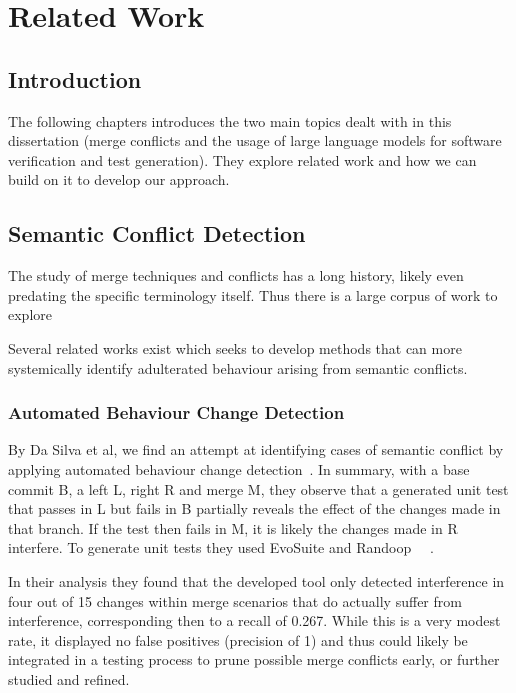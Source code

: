 \chapter{Related Work} \label{chap:sota}

\section{Introduction}

 The following chapters introduces the two main topics dealt with in this dissertation (merge conflicts and the usage of large language models for software verification and test generation). They explore related work and how we can build on it to develop our approach.

\section{Semantic Conflict Detection}

The study of merge techniques and conflicts has a long history, likely even predating the specific terminology itself. Thus there is a large corpus of work to explore

Several related works exist which seeks to develop methods that can more systemically identify adulterated behaviour arising from semantic conflicts.

\subsection{Automated Behaviour Change Detection}

By Da Silva et al, we find an attempt at identifying cases of semantic conflict by applying automated behaviour change detection~\citep{kn:leuson}. In summary, with a base commit B, a left L, right R and merge M, they observe that a generated unit test that passes in L but fails in B partially reveals the effect of the changes made in that branch. If the test then fails in M, it is likely the changes made in R interfere. To generate unit tests they used EvoSuite and Randoop~\citep{kn:randoop}
~\citep{kn:evosuite}.

In their analysis they found that the developed tool only detected interference in four out of 15 changes within merge scenarios that do actually suffer from interference, corresponding then to a recall of 0.267. While this is a very modest rate, it displayed no false positives (precision of 1) and thus could likely be integrated in a testing process to prune possible merge conflicts early, or further studied and refined.



